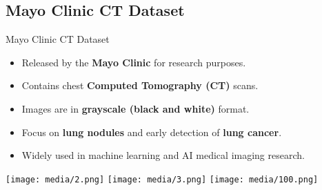 \subsection{Mayo Clinic CT Dataset}

\begin{frame}{Mayo Clinic CT Dataset}
  \begin{itemize}
    \item Released by the \textbf{Mayo Clinic} for research purposes.
    \item Contains chest \textbf{Computed Tomography (CT)} scans.
    \item Images are in \textbf{grayscale (black and white)} format.
    \item Focus on \textbf{lung nodules} and early detection of \textbf{lung cancer}.
    \item Widely used in machine learning and AI medical imaging research.
  \end{itemize}
  \vspace{0.5cm}
  \begin{center}
    \texttt{[image: media/2.png]}
    \hspace{0.3cm}
    \texttt{[image: media/3.png]}
    \hspace{0.3cm}
    \texttt{[image: media/100.png]}
  \end{center}
\end{frame}